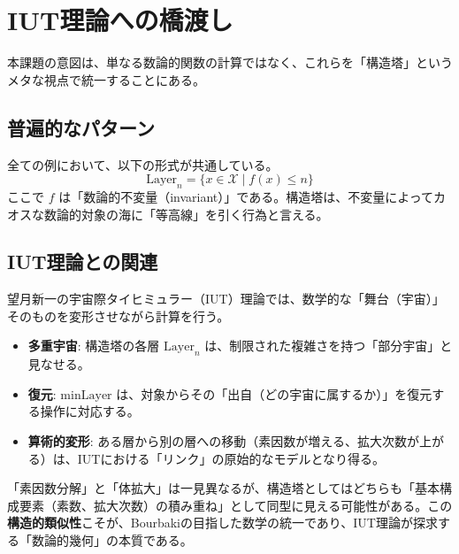 \documentclass[a4paper,11pt]{ltjsarticle}
\theoremstyle{definition}
\newcommand{\Carrier}{\mathcal{X}}
\newcommand{\Layer}[1]{\mathrm{Layer}_{#1}}
\newcommand{\MinLayer}{\mathrm{minLayer}}
\begin{document}
\section{IUT理論への橋渡し}

本課題の意図は、単なる数論的関数の計算ではなく、これらを「構造塔」というメタな視点で統一することにある。

\subsection{普遍的なパターン}
全ての例において、以下の形式が共通している。
\[ \Layer{n} = \{ x \in \Carrier \mid f(x) \le n \} \]
ここで $f$ は「数論的不変量（invariant）」である。構造塔は、不変量によってカオスな数論的対象の海に「等高線」を引く行為と言える。

\subsection{IUT理論との関連}
望月新一の宇宙際タイヒミュラー（IUT）理論では、数学的な「舞台（宇宙）」そのものを変形させながら計算を行う。
\begin{itemize}
    \item \textbf{多重宇宙}: 構造塔の各層 $\Layer{n}$ は、制限された複雑さを持つ「部分宇宙」と見なせる。
    \item \textbf{復元}: $\MinLayer$ は、対象からその「出自（どの宇宙に属するか）」を復元する操作に対応する。
    \item \textbf{算術的変形}: ある層から別の層への移動（素因数が増える、拡大次数が上がる）は、IUTにおける「リンク」の原始的なモデルとなり得る。
\end{itemize}

\begin{tcolorbox}[colback=blue!5!white,colframe=blue!75!black,title=Group Workのヒント]
「素因数分解」と「体拡大」は一見異なるが、構造塔としてはどちらも「基本構成要素（素数、拡大次数）の積み重ね」として同型に見える可能性がある。この\textbf{構造的類似性}こそが、Bourbakiの目指した数学の統一であり、IUT理論が探求する「数論的幾何」の本質である。
\end{tcolorbox}
\end{document}
